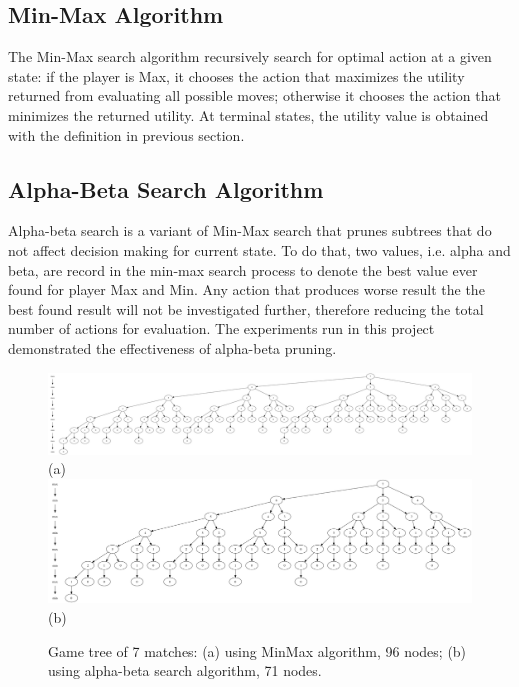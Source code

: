 \documentclass{article}
\begin{document}
\subsection{Min-Max Algorithm}
The Min-Max search algorithm recursively search for optimal action at a given state: if the player is Max, it chooses the action that maximizes the utility returned from evaluating all possible moves; otherwise it chooses the action that minimizes the returned utility. At terminal states, the utility value is obtained with the definition in previous section.

\subsection{Alpha-Beta Search Algorithm}
Alpha-beta search is a variant of Min-Max search that prunes subtrees that do not affect decision making for current state. To do that, two values, i.e. alpha and beta, are record in the min-max search process to denote the best value ever found for player Max and Min. Any action that produces worse result the the best found result will not be investigated further, therefore reducing the total number of actions for evaluation. The experiments run in this project demonstrated the effectiveness of alpha-beta pruning.

\begin{figure}[htbp]
\center
\includegraphics[scale=0.1]{images/7_minmax.png}\\
(a)\\
\includegraphics[scale=0.1]{images/7_ab.png}\\
(b)
\caption{Game tree of 7 matches: (a) using MinMax algorithm, 96 nodes; (b) using alpha-beta search algorithm, 71 nodes.}\label{fig:tree7}
\end{figure}
\end{document}
